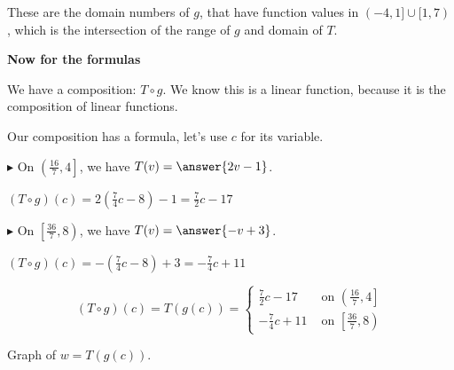 \documentclass{ximera}
\begin{document}
These are the domain numbers of $g$, that have function values in $(-4,1] \cup [1,7)$, which is the intersection of the range of $g$ and domain of $T$.



\textbf{Now for the formulas} 


We have a composition: $T \circ g$.  We know this is a linear function, because it is the composition of linear functions. 



\begin{explanation}
Our composition has a formula, let's use $c$ for its variable. 


$\blacktriangleright$ On $\left(\frac{16}{7}, 4\right]$, we have $T(v) = \answer{2v - 1}$.  



$(T \circ g)(c) = 2\left( \frac{7}{4}c - 8 \right) - 1 = \frac{7}{2}c - 17$ 





$\blacktriangleright$ On $\left[\frac{36}{7}, 8\right)$,  we have $T(v) = \answer{-v + 3}$. 

$(T \circ g)(c) = -\left(\frac{7}{4}c - 8\right) + 3 = -\frac{7}{4}c + 11$










\[
(T \circ g)(c) = T(g(c)) = 
\begin{cases}
  \frac{7}{2}c - 17     &     \text{ on }  \left(\frac{16}{7}, 4\right] \\
  -\frac{7}{4}c + 11   &     \text{ on }  \left[\frac{36}{7}, 8\right)
\end{cases}
\]




\end{explanation}










Graph of $w = T(g(c))$.
\end{document}
